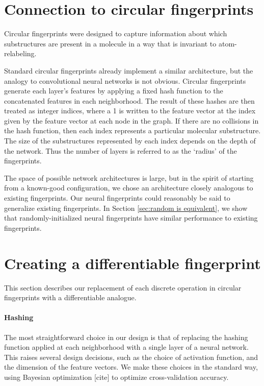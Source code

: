 \documentclass{article}
\begin{document}
\section{Connection to circular fingerprints}

Circular fingerprints were designed to capture information about which substructures are present in a molecule in a way that is invariant to atom-relabeling.

Standard circular fingerprints already implement a similar architecture, but the analogy to convolutional neural networks is not obvious.
Circular fingerprints generate each layer's features by applying a fixed hash function to the concatenated features in each neighborhood.
The result of these hashes are then treated as integer indices, where a 1 is written to the feature vector at the index given by the feature vector at each node in the graph.
If there are no collisions in the hash function, then each index represents a particular molecular substructure.
The size of the substructures represented by each index depends on the depth of the network.
Thus the number of layers is referred to as the `radius' of the fingerprints.

The space of possible network architectures is large, but in the spirit of starting from a known-good configuration, we chose an architecture closely analogous to existing fingerprints.
Our neural fingerprints could reasonably be said to generalize existing fingerprints.
In Section \ref{sec:random is equivalent}, we show that randomly-initialized neural fingerprints have similar performance to existing fingerprints.

\section{Creating a differentiable fingerprint}
This section describes our replacement of each discrete operation in circular fingerprints with a differentiable analogue.

\paragraph{Hashing}
The most straightforward choice in our design is that of replacing the hashing function applied at each neighborhood with a single layer of a neural network.
This raises several design decisions, such as the choice of activation function, and the dimension of the feature vectors.
We make these choices in the standard way, using Bayesian optimization [cite] to optimize cross-validation accuracy.
\end{document}
